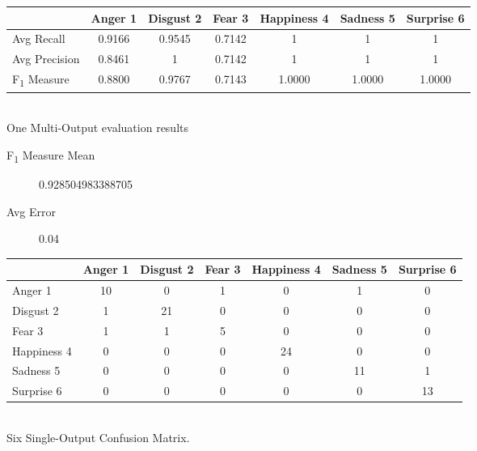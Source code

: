 \documentclass[a4paper,11pt]{article}
\begin{document}
                                                               
 \begin{center}                                                                  
 \begin{tabular}{ | l || c | c | c | c | c | c | }                               
     \hline                                                                      
           							& Anger 1 & Disgust 2 & Fear 3 & Happiness 4 & Sadness 5 & Surprise 6 \\ \hline \hline
         Avg Recall 				& 0.9166 & 0.9545 & 0.7142 & 1 & 1 & 1 \\ \hline   
         Avg Precision 				& 0.8461 & 1 & 0.7142 & 1 & 1 & 1 \\ \hline
         F\textsubscript{1} Measure & 0.8800 & 0.9767 & 0.7143 &  1.0000 &  1.0000 & 1.0000 \\ \hline
     \end{tabular}                                                               
     \\ One Multi-Output evaluation results    
 \end{center}                                                                    

\begin{description}
	\item[F\textsubscript{1} Measure Mean] 0.928504983388705
	\item[Avg Error] 0.04
\end{description}

                                                             
\begin{center}                                                                  
     \begin{tabular}{ | l || c | c | c | c | c | c | }                           
     \hline                                                                      
           & Anger 1 & Disgust 2 & Fear 3 & Happiness 4 & Sadness 5 & Surprise 6 \\ \hline \hline
         Anger 1 		& 10 & 0 & 1 & 0 & 1 & 0 \\ \hline                               
         Disgust 2 		& 1 & 21 & 0 & 0 & 0 & 0 \\ \hline                            
         Fear 3 		& 1 & 1 & 5 & 0 & 0 & 0 \\ \hline                                
         Happiness 4 	& 0 & 0 & 0 & 24 & 0 & 0 \\ \hline                          
         Sadness 5 		& 0 & 0 & 0 & 0 & 11 & 1 \\ \hline                             
         Surprise 6 	& 0 & 0 & 0 & 0 & 0 & 13 \\ \hline                           
     \end{tabular}                                                               
     \\ Six Single-Output Confusion Matrix.                                              
\end{center}                                                                    
\end{document}
